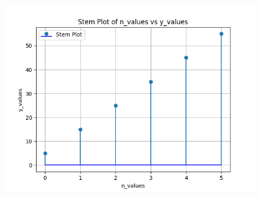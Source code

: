 \documentclass[journal,12pt,onecolumn]{IEEEtran}
\theoremstyle{remark}
\begin{document}
\begin{figure}[h]
    \centering
    \includegraphics[width=\columnwidth]{./figs/fig2.png}
\end{figure}
\end{document}
